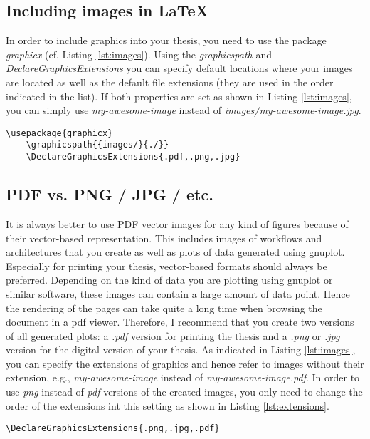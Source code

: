 \documentclass{article}
\begin{document}
\subsection{Including images in \LaTeX}

In order to include graphics into your thesis, you need to use the package \emph{graphicx} (cf. Listing \ref{lst:images}).
Using the \emph{graphicspath} and \emph{DeclareGraphicsExtensions} you can specify default locations where your images are located as well as the default file extensions (they are used in the order indicated in the list).
If both properties are set as shown in Listing \ref{lst:images}, you can simply use \emph{my-awesome-image} instead of \emph{images/my-awesome-image.jpg}.

\begin{lstlisting}[label={lst:images},caption='Packages and settings for including images']
	\usepackage{graphicx}
	\graphicspath{{images/}{./}}
	\DeclareGraphicsExtensions{.pdf,.png,.jpg}
\end{lstlisting}


\subsection{PDF vs. PNG / JPG / etc.}

It is always better to use PDF vector images for any kind of figures because of their vector-based representation.
This includes images of workflows and architectures that you create as well as plots of data generated using gnuplot.
Especially for printing your thesis, vector-based formats should always be preferred.
Depending on the kind of data you are plotting using gnuplot or similar software, these images can contain a large amount of data point.
Hence the rendering of the pages can take quite a long time when browsing the document in a pdf viewer.
Therefore, I recommend that you create two versions of all generated plots: a \emph{.pdf} version for printing the thesis and a \emph{.png} or \emph{.jpg} version for the digital version of your thesis.
As indicated in Listing \ref{lst:images}, you can specify the extensions of graphics and hence refer to images without their extension, e.g., \emph{my-awesome-image} instead of \emph{my-awesome-image.pdf}.
In order to use \emph{png} instead of \emph{pdf} versions of the created images, you only need to change the order of the extensions int this setting as shown in Listing \ref{lst:extensions}.

\begin{lstlisting}[label={lst:extensions},caption='Packages and settings for including images']
	\DeclareGraphicsExtensions{.png,.jpg,.pdf}
\end{lstlisting}
\end{document}
